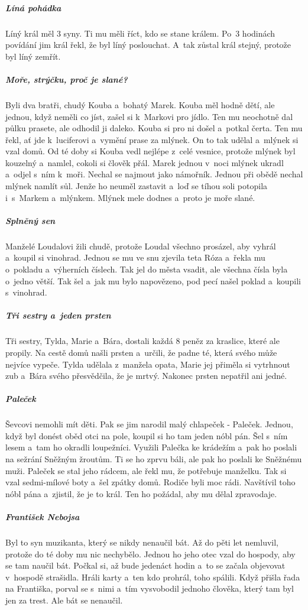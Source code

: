 {{\subparagraph{Líná pohádka}
	Líný král měl 3 syny. Ti mu měli říct, kdo se stane králem. Po~3 hodinách
	povídání jim král řekl, že byl líný poslouchat. A~tak zůstal král stejný,
	protože byl líný zemřít.

\subparagraph{Moře, strýčku, proč je slané?}
	Byli dva bratři, chudý Kouba a~bohatý Marek. Kouba měl hodně dětí, ale jednou,
	když neměli co jíst, zašel si k~Markovi pro jídlo. Ten mu neochotně dal půlku
	prasete, ale odhodil ji daleko. Kouba si pro ni došel a~potkal čerta. Ten mu
	řekl, ať jde k~luciferovi a~vymění prase za mlýnek. On to tak udělal a~mlýnek
	si vzal domů. Od té doby si Kouba vedl nejlépe z~celé vesnice, protože mlýnek
	byl kouzelný a~namlel, cokoli si člověk přál. Marek jednou v~noci mlýnek ukradl
	a~odjel s~ním k~moři. Nechal se najmout jako námořník. Jednou při obědě nechal
	mlýnek namlít sůl. Jenže ho neuměl zastavit a~loď se tíhou soli potopila
i~s~Markem a~mlýnkem. Mlýnek mele dodnes a~proto je moře slané.

\subparagraph{Splněný sen}
	Manželé Loudalovi žili chudě, protože Loudal všechno prosázel, aby vyhrál
a~koupil si vinohrad. Jednou se mu ve snu zjevila teta Róza a~řekla mu o~pokladu
	a~výherních číslech. Tak jel do města vsadit, ale všechna čísla byla o~jedno
	větší. Tak šel a~jak mu bylo napovězeno, pod pecí našel poklad a~koupili
s~vinohrad.

\subparagraph{Tři sestry a~jeden prsten}
	Tři sestry, Tylda, Marie a~Bára, dostali každá 8 peněz za kraslice, které ale
	propily. Na cestě domů našli prsten a~určili, že padne té, která svého může
	nejvíce vypeče. Tylda udělala z~manžela opata, Marie jej přiměla si vytrhnout
	zub a~Bára svého přesvědčila, že je mrtvý. Nakonec prsten nepatřil ani jedné.

\subparagraph{Paleček}
	Ševcovi nemohli mít děti. Pak se jim narodil malý chlapeček - Paleček. Jednou,
	když byl donést oběd otci na pole, koupil si ho tam jeden nóbl pán. Šel s~ním
	lesem a~tam ho okradli loupežníci. Využili Palečka ke krádežím a~pak ho poslali
	na sežrání Sněžným žroutům. Ti se ho zprvu báli, ale pak ho poslali ke Sněžnému
	muži. Paleček se stal jeho rádcem, ale řekl mu, že potřebuje manželku. Tak si
	vzal sedmi-mílové boty a~šel zpátky domů. Rodiče byli moc rádi. Navštívil toho
	nóbl pána a~zjistil, že je to král. Ten ho požádal, aby mu dělal zpravodaje.

\subparagraph{František Nebojsa}
	Byl to syn muzikanta, který se nikdy nenaučil bát. Až do pěti let nemluvil,
	protože do té doby mu nic nechybělo. Jednou ho jeho otec vzal do hospody, aby
	se tam naučil bát. Počkal si, až bude jedenáct hodin a~to se začala objevovat
	v~hospodě strašidla. Hráli karty a~ten kdo prohrál, toho spálili. Když přišla
	řada na Františka, porval se s~nimi a~tím vysvobodil jednoho člověka, který tam
	byl jen za trest. Ale bát se nenaučil.

}}
